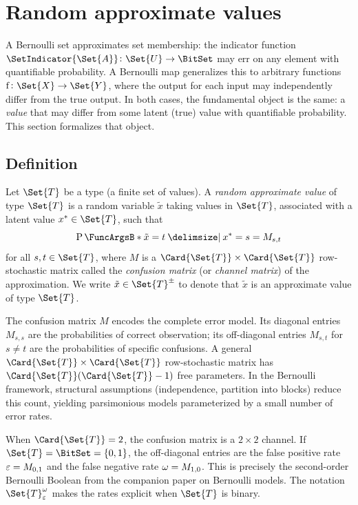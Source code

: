 \documentclass[ ../main.tex]{subfiles}
\begin{document}
\section{Random approximate values}
\label{sec:approx_values}

A Bernoulli set approximates set membership: the indicator function $\SetIndicator{\Set{A}} \colon \Set{U} \to \BitSet$ may err on any element with quantifiable probability.
A Bernoulli map generalizes this to arbitrary functions $\Fun{f} \colon \Set{X} \to \Set{Y}$, where the output for each input may independently differ from the true output.
In both cases, the fundamental object is the same: a \emph{value} that may differ from some latent (true) value with quantifiable probability.
This section formalizes that object.

\subsection{Definition}

\begin{definition}
\label{def:approx_value}
Let $\Set{T}$ be a type (a finite set of values).
A \emph{random approximate value} of type $\Set{T}$ is a random variable $\tilde{x}$ taking values in $\Set{T}$, associated with a latent value $x^* \in \Set{T}$, such that
\begin{equation}
\label{eq:approx_value_pmf}
\Prob{\tilde{x} = t \Given x^* = s} = M_{s,t}
\end{equation}
for all $s, t \in \Set{T}$, where $M$ is a $\Card{\Set{T}} \times \Card{\Set{T}}$ row-stochastic matrix called the \emph{confusion matrix} (or \emph{channel matrix}) of the approximation.
We write $\tilde{x} \in \AT{\Set{T}}$ to denote that $\tilde{x}$ is an approximate value of type $\Set{T}$.
\end{definition}

The confusion matrix $M$ encodes the complete error model.
Its diagonal entries $M_{s,s}$ are the probabilities of correct observation; its off-diagonal entries $M_{s,t}$ for $s \neq t$ are the probabilities of specific confusions.
A general $\Card{\Set{T}} \times \Card{\Set{T}}$ row-stochastic matrix has $\Card{\Set{T}}(\Card{\Set{T}} - 1)$ free parameters.
In the Bernoulli framework, structural assumptions (independence, partition into blocks) reduce this count, yielding parsimonious models parameterized by a small number of error rates.

\begin{remark}
When $\Card{\Set{T}} = 2$, the confusion matrix is a $2 \times 2$ channel.
If $\Set{T} = \BitSet = \{0, 1\}$, the off-diagonal entries are the false positive rate $\varepsilon = M_{0,1}$ and the false negative rate $\omega = M_{1,0}$.
This is precisely the second-order Bernoulli Boolean from the companion paper on Bernoulli models.
The notation $\AT{\Set{T}}[\fprate][\fnrate]$ makes the rates explicit when $\Set{T}$ is binary.
\end{remark}
\end{document}
